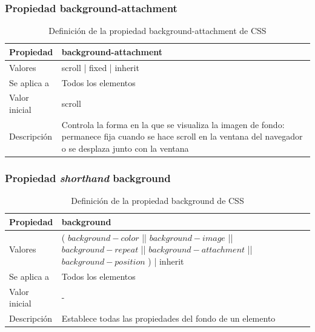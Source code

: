 \begin{frame}
\frametitle{Propiedad background-attachment}

\begin{center}
  \begin{table}
   \begin{tabular}{p{1.8cm}p{7.8cm}}
Propiedad & \bf{background-attachment} \\ \hline
Valores& scroll | fixed | inherit \\ \hline
Se aplica a& Todos los elementos \\ \hline
Valor inicial& scroll \\ \hline
Descripción& Controla la forma en la que se visualiza la imagen de fondo: permanece fija cuando se hace scroll en la ventana del navegador o se desplaza junto con la ventana \\ \hline
  \end{tabular}
   \caption{Definición de la propiedad background-attachment de CSS}
 \end{table}
\end{center}


\end{frame}



\begin{frame}
\frametitle{Propiedad \emph{shorthand} background}

\begin{center}
  \begin{table}
   \begin{tabular}{p{1.8cm}p{7.8cm}}
Propiedad & \bf{background} \\ \hline
Valores& ( $background-color$ || $background-image$ || $background-repeat$ || $background-attachment$ || $background-position$ ) | inherit \\ \hline
Se aplica a& Todos los elementos \\ \hline
Valor inicial& - \\ \hline
Descripción& Establece todas las propiedades del fondo de un elemento \\ \hline
  \end{tabular}
   \caption{Definición de la propiedad background de CSS}
 \end{table}
\end{center}


\end{frame}



